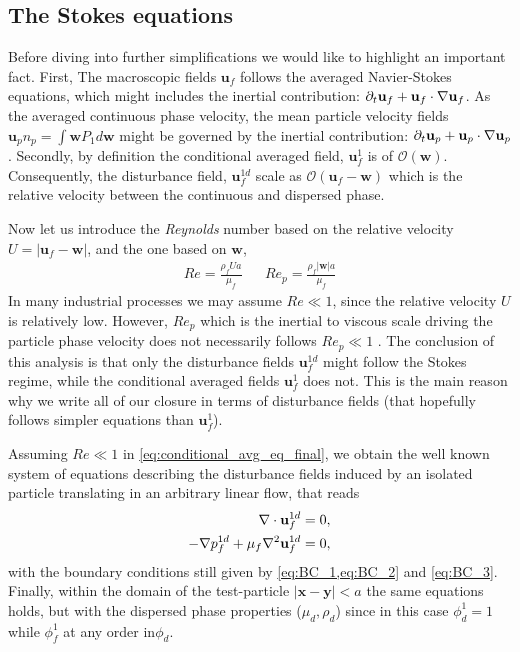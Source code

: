 \subsection{The Stokes equations}

Before diving into further simplifications we would like to highlight an important fact. 
First, The macroscopic fields $\textbf{u}_f$ follows the averaged Navier-Stokes equations, which might includes the inertial contribution: $\partial_t \textbf{u}_f + \textbf{u}_f\cdot \mathbf{\nabla} \textbf{u}_f$. 
As the averaged continuous phase velocity, the mean particle velocity fields $\textbf{u}_p n_p= \int \textbf{w} P_1d\textbf{w}$ might be governed by the inertial contribution: $\partial_t \textbf{u}_p + \textbf{u}_p\cdot \mathbf{\nabla} \textbf{u}_p$.   
Secondly, by definition the conditional averaged field, $\textbf{u}_f^{1}$ is of $\mathcal{O}(\textbf{w})$. 
Consequently, the disturbance field, $\textbf{u}_f^{1d}$ scale as $\mathcal{O}(\textbf{u}_f - \textbf{w})$ which is the relative velocity between the continuous and dispersed phase. 

Now let us introduce the \textit{Reynolds} number based on the relative velocity $U =|\textbf{u}_f- \textbf{w}|$, and the one based on $\textbf{w}$, 
\begin{align}
    Re = \frac{\rho_f U a}{\mu_f} && 
    Re_p = \frac{\rho_f |\textbf{w}| a}{\mu_f} 
\end{align} 
In many industrial processes we may assume $Re \ll 1$, since the relative velocity $U$ is relatively low. 
However, $Re_p$ which is the inertial to viscous scale driving the particle phase velocity does not necessarily follows $Re_p \ll 1$ .  
The conclusion of this analysis is that only the disturbance fields $\textbf{u}_f^{1d}$ might follow the Stokes regime, while the conditional averaged fields $\textbf{u}_f^1$ does not. 
This is the main reason why we write all of our closure in terms of disturbance fields (that hopefully follows simpler equations than $\textbf{u}_f^1$). 

Assuming $Re \ll 1$ in \ref{eq:conditional_avg_eq_final}, we obtain the well known system of equations describing the disturbance fields induced by an isolated particle translating in an arbitrary linear flow, that reads 
\begin{align}
    \div \textbf{u}^{1d}_f &= 0,  \\
    - \grad p_f^{1d} 
    + \mu_f \grad^2 \textbf{u}^{1d}_f  
    &= 0, 
    \label{eq:conditional_avg_eq_final_stokes}
\end{align}
with the boundary conditions still given by \ref{eq:BC_1,eq:BC_2} and \ref{eq:BC_3}. 
Finally, within the domain of the test-particle $|\textbf{x}-\textbf{y}|<a$ the same equations holds, but with the dispersed phase properties ($\mu_d,\rho_d$) since in this case $\phi_d^1= 1$ while $\phi_f^1$ at any order in$\phi_d$. 

